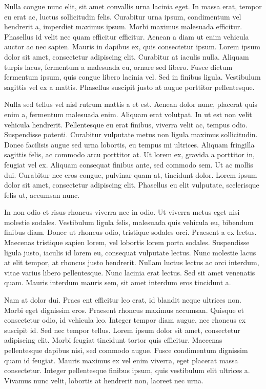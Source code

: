 \documentclass[
  12pt,
  a4paper,
  oneside]{book}
\begin{document}
Nulla congue nunc elit, sit amet convallis urna lacinia eget. In massa erat, tempor eu erat ac, luctus sollicitudin felis. Curabitur urna ipsum, condimentum vel hendrerit a, imperdiet maximus ipsum. Morbi maximus malesuada efficitur. Phasellus id velit nec quam efficitur efficitur. Aenean a diam ut enim vehicula auctor ac nec sapien. Mauris in dapibus ex, quis consectetur ipsum. Lorem ipsum dolor sit amet, consectetur adipiscing elit. Curabitur at iaculis nulla. Aliquam turpis lacus, fermentum a malesuada eu, ornare sed libero. Fusce dictum fermentum ipsum, quis congue libero lacinia vel. Sed in finibus ligula. Vestibulum sagittis vel ex a mattis. Phasellus suscipit justo at augue porttitor pellentesque.

Nulla sed tellus vel nisl rutrum mattis a et est. Aenean dolor nunc, placerat quis enim a, fermentum malesuada enim. Aliquam erat volutpat. In ut est non velit vehicula hendrerit. Pellentesque eu erat finibus, viverra velit ac, tempus odio. Suspendisse potenti. Curabitur vulputate metus non ligula maximus sollicitudin. Donec facilisis augue sed urna lobortis, eu tempus mi ultrices. Aliquam fringilla sagittis felis, ac commodo arcu porttitor at. Ut lorem ex, gravida a porttitor in, feugiat vel ex. Aliquam consequat finibus ante, sed commodo sem. Ut ac mollis dui. Curabitur nec eros congue, pulvinar quam at, tincidunt dolor. Lorem ipsum dolor sit amet, consectetur adipiscing elit. Phasellus eu elit vulputate, scelerisque felis ut, accumsan nunc.

In non odio et risus rhoncus viverra nec in odio. Ut viverra metus eget nisi molestie sodales. Vestibulum ligula felis, malesuada quis vehicula eu, bibendum finibus diam. Donec ut rhoncus odio, tristique sodales orci. Praesent a ex lectus. Maecenas tristique sapien lorem, vel lobortis lorem porta sodales. Suspendisse ligula justo, iaculis id lorem eu, consequat vulputate lectus. Nunc molestie lacus at elit tempor, at rhoncus justo hendrerit. Nullam luctus lectus ac orci interdum, vitae varius libero pellentesque. Nunc lacinia erat lectus. Sed sit amet venenatis quam. Mauris interdum mauris sem, sit amet interdum eros tincidunt a.

Nam at dolor dui. Praes ent efficitur leo erat, id blandit neque ultrices non. Morbi eget dignissim eros. Praesent rhoncus maximus accumsan. Quisque et consectetur odio, id vehicula leo. Integer tempor diam augue, nec rhoncus ex suscipit id. Sed nec tempor tellus. Lorem ipsum dolor sit amet, consectetur adipiscing elit. Morbi feugiat tincidunt tortor quis efficitur. Maecenas pellentesque dapibus nisi, sed commodo augue. Fusce condimentum dignissim quam id feugiat. Mauris maximus ex vel enim viverra, eget placerat massa consectetur. Integer pellentesque finibus ipsum, quis vestibulum elit ultrices a. Vivamus nunc velit, lobortis at hendrerit non, laoreet nec urna.
\end{document}
